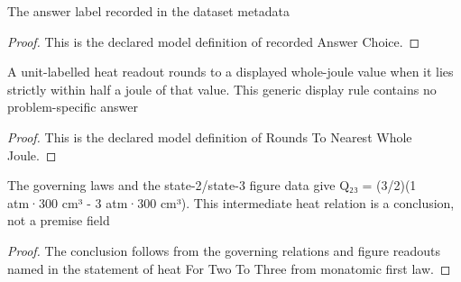 \begin{definition}
  \label{def:physics:phyx-mini-0412:phyxminiproblems-problemphyxmini0412-recordedanswerchoice}
  The answer label recorded in the dataset metadata
\end{definition}
\begin{proof}
  This is the declared model definition of recorded Answer Choice.
\end{proof}
\begin{definition}
  \label{def:physics:phyx-mini-0412:phyxminiproblems-problemphyxmini0412-roundstonearestwholejoule}
  A unit-labelled heat readout rounds to a displayed whole-joule value when it lies strictly within half a joule of that value. This generic display rule contains no problem-specific answer
\end{definition}
\begin{proof}
  This is the declared model definition of Rounds To Nearest Whole Joule.
\end{proof}
\begin{lemma}
  \label{lem:physics:phyx-mini-0412:phyxminiproblems-problemphyxmini0412-heatfortwotothree-from-monatomic-first-law}
  The governing laws and the state-2/state-3 figure data give Q₂₃ = (3/2)(1 atm·300 cm³ - 3 atm·300 cm³). This intermediate heat relation is a conclusion, not a premise field
\end{lemma}
\begin{proof}
  The conclusion follows from the governing relations and figure readouts named in the statement of heat For Two To Three from monatomic first law.
\end{proof}
